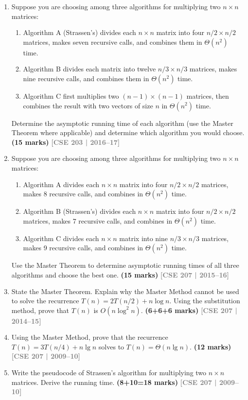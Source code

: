 \documentclass[12pt,a3paper]{article}
\newcommand{\yr}[1]{\hfill\textcolor{gray}{\small\textbf{[#1]}}}
\newcommand{\mk}[1]{\textcolor{orange!70!black}{\small\textbf{(#1 marks)}}}
\begin{document}
\begin{enumerate}
\item Suppose you are choosing among three algorithms for multiplying two $n \times n$ matrices:
\begin{enumerate}
  \item Algorithm A (Strassen's) divides each $n \times n$ matrix into four $n/2 \times n/2$ matrices, makes seven recursive calls, and combines them in $\Theta(n^2)$ time.
  \item Algorithm B divides each matrix into twelve $n/3 \times n/3$ matrices, makes nine recursive calls, and combines them in $\Theta(n^2)$ time.
  \item Algorithm C first multiplies two $(n-1) \times (n-1)$ matrices, then combines the result with two vectors of size $n$ in $\Theta(n^2)$ time.
\end{enumerate}
Determine the asymptotic running time of each algorithm (use the Master Theorem where applicable) and determine which algorithm you would choose. \mk{15}
\yr{CSE 203 | 2016--17}

\item Suppose you are choosing among three algorithms for multiplying two $n \times n$ matrices:
\begin{enumerate}
  \item Algorithm A divides each $n \times n$ matrix into four $n/2 \times n/2$ matrices, makes 8 recursive calls, and combines in $\Theta(n^2)$ time.
  \item Algorithm B (Strassen's) divides each $n \times n$ matrix into four $n/2 \times n/2$ matrices, makes 7 recursive calls, and combines in $\Theta(n^2)$ time.
  \item Algorithm C divides each $n \times n$ matrix into nine $n/3 \times n/3$ matrices, makes 9 recursive calls, and combines in $\Theta(n^2)$ time.
\end{enumerate}
Use the Master Theorem to determine asymptotic running times of all three algorithms and choose the best one. \mk{15}
\yr{CSE 207 | 2015--16}

\item State the Master Theorem. Explain why the Master Method cannot be used to solve the recurrence $T(n) = 2T(n/2) + n\log n$. Using the substitution method, prove that $T(n)$ is $O(n\log^2 n)$. \mk{6+6+6}
\yr{CSE 207 | 2014--15}

\item Using the Master Method, prove that the recurrence $T(n) = 3T(n/4) + n\lg n$ solves to $T(n) = \Theta(n\lg n)$. \mk{12}
\yr{CSE 207 | 2009--10}

\item Write the pseudocode of Strassen's algorithm for multiplying two $n \times n$ matrices. Derive the running time. \mk{8+10=18}
\yr{CSE 207 | 2009--10}

\end{enumerate}
\newpage
\end{document}
